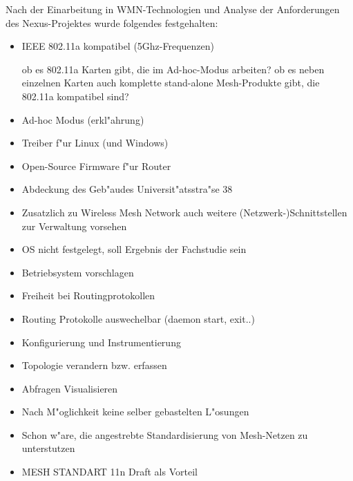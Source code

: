Nach der Einarbeitung in WMN-Technologien und 
Analyse der Anforderungen des Nexus-Projektes
wurde folgendes festgehalten:

\begin{itemize}
	
	\item IEEE 802.11a kompatibel (5Ghz-Frequenzen) 
	
	ob es 802.11a Karten gibt, die im Ad-hoc-Modus arbeiten? 
	ob es neben einzelnen Karten auch komplette stand-alone 
	Mesh-Produkte gibt, die 802.11a kompatibel sind?

	\item Ad-hoc Modus (erkl"ahrung)
	
	\item Treiber f"ur Linux (und Windows) 

	\item Open-Source Firmware f"ur Router 

	\item Abdeckung des Geb"audes Universit"atsstra"se 38 

	\item Zusatzlich zu Wireless Mesh Network auch weitere
	(Netzwerk-)Schnittstellen zur Verwaltung vorsehen 

	\item OS nicht festgelegt, soll Ergebnis der Fachstudie sein 

	\item Betriebsystem vorschlagen

	\item Freiheit bei Routingprotokollen 

	\item Routing Protokolle auswechelbar (daemon start, exit..) 

	\item Konfigurierung und Instrumentierung 

	\item Topologie verandern bzw. erfassen 

	\item Abfragen Visualisieren 

	\item Nach M"oglichkeit keine selber gebastelten L"osungen 

	\item Schon w"are, die angestrebte Standardisierung von
	Mesh-Netzen zu unterstutzen 

	\item MESH STANDART 11n Draft als Vorteil 


\end{itemize}
